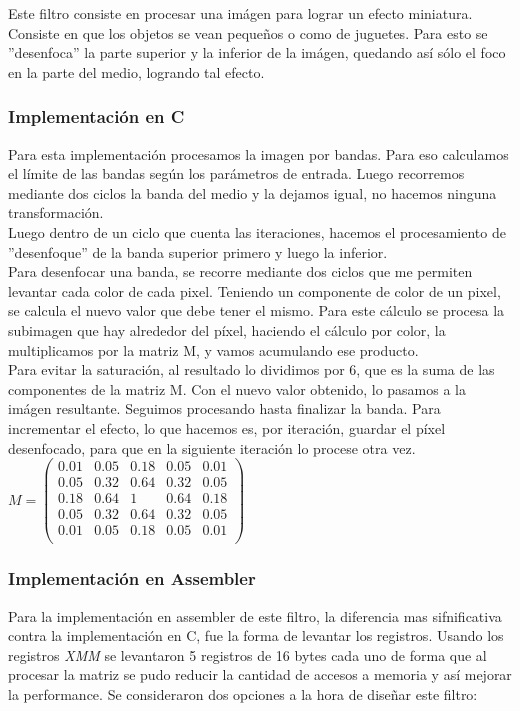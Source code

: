 Este filtro consiste en procesar una im\'agen para lograr un efecto miniatura. Consiste en que los objetos se vean pequeños o como de juguetes. Para esto se ''desenfoca'' la parte superior y la inferior de la im\'agen, quedando as\'i s\'olo el foco en la parte del medio, logrando tal efecto.



\subsubsection{Implementación en C}
Para esta implementaci\'on procesamos la imagen por bandas.
Para eso calculamos el límite de las bandas seg\'un los par\'ametros de entrada. Luego recorremos mediante dos ciclos la banda del medio y la dejamos igual, no hacemos ninguna transformaci\'on.\\
Luego dentro de un ciclo que cuenta las iteraciones, hacemos el procesamiento de ''desenfoque'' de la banda superior primero y luego la inferior.\\
Para desenfocar una banda, se recorre mediante dos ciclos que me permiten levantar cada color de cada pixel. Teniendo un componente de color de un pixel, se calcula el nuevo valor que debe tener el mismo. Para este c\'alculo se procesa la subimagen que hay alrededor del píxel, haciendo el c\'alculo por color, la multiplicamos por la matriz M, y vamos acumulando ese producto.\\
Para evitar la saturaci\'on, al resultado lo dividimos por 6, que es la suma de las componentes de la matriz M. Con el nuevo valor obtenido, lo pasamos a la im\'agen resultante. Seguimos procesando hasta finalizar la banda.
Para incrementar el efecto, lo que hacemos es, por iteraci\'on, guardar el p\'ixel desenfocado, para que en la siguiente iteración lo procese otra vez.\\

$M = \begin{pmatrix}
  0.01 & 0.05 & 0.18 & 0.05 & 0.01 \\
  0.05 & 0.32 & 0.64 & 0.32 & 0.05 \\
  0.18 & 0.64 & 1 & 0.64 & 0.18 \\
  0.05 & 0.32 & 0.64 & 0.32 & 0.05 \\
  0.01 & 0.05 & 0.18 & 0.05 & 0.01 \\
 \end{pmatrix}$

\subsubsection{Implementación en Assembler}
Para la implementaci\'on en assembler de este filtro, la diferencia mas sifnificativa contra la implementaci\'on en C, fue la forma de levantar los registros.
Usando los registros \emph{XMM} se levantaron 5 registros de 16 bytes cada uno de forma que al procesar la matriz se pudo reducir la cantidad de accesos a
 memoria y as\'i mejorar la performance. Se consideraron dos opciones a la hora de diseñar este filtro:\newline

